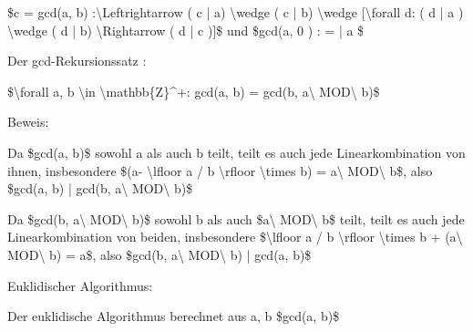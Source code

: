 \documentclass[a4paper]{article}
\begin{document}
\begin{multicols}{3}
      \begin{itemize*}
            \item \$c = gcd(a, b) :\textbackslash Leftrightarrow ( c | a)
            \textbackslash wedge ( c | b) \textbackslash wedge
            {[}\textbackslash forall d: ( d | a ) \textbackslash wedge (
            d | b) \textbackslash Rightarrow ( d | c ){]}\$ und
            \$gcd(a, 0 ) : = | a \textbar\$
            \item Der gcd-Rekursionssatz :
            \begin{itemize*}
                  \item \$\textbackslash forall a, b \textbackslash in \textbackslash mathbb\{Z\}\^{}+: gcd(a, b) = gcd(b, a\textbackslash{} MOD\textbackslash{} b)\$
                  \item Beweis:
                  \begin{itemize*} \item Da \$gcd(a, b)\$ sowohl a als auch b teilt, teilt es auch jede Linearkombination von ihnen, insbesondere \$(a- \textbackslash lfloor a / b \textbackslash rfloor \textbackslash times b) = a\textbackslash{} MOD\textbackslash{} b\$, also \$gcd(a, b) | gcd(b, a\textbackslash{} MOD\textbackslash{} b)\$ \item Da \$gcd(b, a\textbackslash{} MOD\textbackslash{} b)\$ sowohl b als auch \$a\textbackslash{} MOD\textbackslash{} b\$ teilt, teilt es auch jede Linearkombination von beiden, insbesondere \$\textbackslash lfloor a / b \textbackslash rfloor \textbackslash times b + (a\textbackslash{} MOD\textbackslash{} b) = a\$, also \$gcd(b, a\textbackslash{} MOD\textbackslash{} b) | gcd(a, b)\$ \end{itemize*}
            \end{itemize*}
            \item Euklidischer Algorithmus:
            \begin{itemize*}
                  \item Der euklidische Algorithmus berechnet aus a, b \$gcd(a, b)\$
            \end{itemize*}

\end{itemize*}
\end{multicols}
\end{document}
